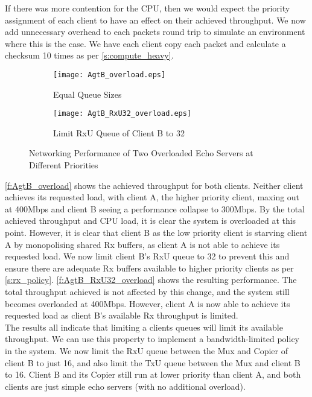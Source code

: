 If there was more contention for the CPU, then we would expect the priority assignment of each client to have an effect
on their achieved throughput. We now add unnecessary overhead to each packets round trip to simulate an environment where
this is the case. We have each client copy each packet and calculate a checksum 10 times as per \autoref{s:compute_heavy}. 

\noindent\begin{figure}[H]
    \centering
	\begin{multicols}{2}
		\begin{subfigure}[b]{0.45\textwidth}
        \centering
        \texttt{[image: AgtB\_overload.eps]}
        \caption{Equal Queue Sizes}
        \label{f:AgtB_overload}
    \end{subfigure}\qquad
    \begin{subfigure}[b]{0.45\textwidth}
        \centering
        \texttt{[image: AgtB\_RxU32\_overload.eps]}
        \caption{Limit RxU Queue of Client B to 32}
        \label{f:AgtB_RxU32_overload}
    \end{subfigure}
\end{multicols}
\caption{Networking Performance of Two Overloaded Echo Servers at Different Priorities}
\label{f:AgtB_od}
\end{figure}

\autoref{f:AgtB_overload} shows the achieved throughput for both clients. Neither client achieves its requested load, with client A,
the higher priority client, maxing out at 400Mbps and client B seeing a performance collapse to 300Mbps. By the total achieved throughput
and CPU load, it is clear the system is overloaded at this point. However, it is clear that client B as the low priority client is 
starving client A by monopolising shared Rx buffers, as client A is not able to achieve its requested load. We now limit client B's RxU queue
to 32 to prevent this and ensure there are adequate Rx buffers available to higher priority clients as per \autoref{s:rx_policy}. 
\autoref{f:AgtB_RxU32_overload} shows the resulting performance. The total throughput achieved is not affected by this change, and the
system still becomes overloaded at 400Mbps. However, client A is now able to achieve its requested load as client B's available
Rx throughput is limited. \\

The results all indicate that limiting a clients queues will limit its available throughput. We can use this property to implement 
a bandwidth-limited policy in the system. We now limit the RxU queue between the Mux and Copier of client B to just 16, and also
limit the TxU queue between the Mux and client B to 16. Client B and its Copier still run at lower priority than client A, and both
clients are just simple echo servers (with no additional overload).

